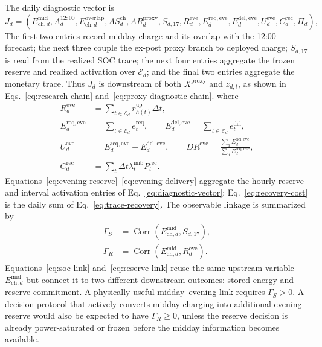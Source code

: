 \documentclass[11pt,a4paper]{article}
\begin{document}
The daily diagnostic vector is
\begin{equation}
  J_d=\left(
  E^{\mathrm{mid}}_{\mathrm{ch},d},
  A^{12{:}00}_d,
  E^{\mathrm{overlap}}_{\mathrm{ch},d},
  AS^{\mathrm{ch}}_d,AR^{\mathrm{proxy}}_d,
  S_{d,17},R^{\mathrm{eve}}_d,
  E^{\mathrm{req,eve}}_d,E^{\mathrm{del,eve}}_d,
  U^{\mathrm{eve}}_d,C^{\mathrm{rec}}_d,\Pi_d
  \right),
  \label{eq:diagnostic-vector}
\end{equation}
The first two entries record midday charge and its overlap with the 12:00
forecast; the next three couple the ex-post proxy branch to deployed charge;
$S_{d,17}$ is read from the realized SOC trace; the next four entries aggregate
the frozen reserve and realized activation over $\mathcal E_d$; and the final
two entries aggregate the monetary trace.  Thus $J_d$ is downstream of both
$X^{\mathrm{proxy}}$ and $z_{d,t}$, as shown in
Eqs.~\eqref{eq:research-chain} and~\eqref{eq:proxy-diagnostic-chain}.
where
\begin{align}
  R^{\mathrm{eve}}_d
  &=\sum_{t\in\mathcal{E}_d}r^{\mathrm{up}}_{h(t)}\Delta t,
  \label{eq:evening-reserve}\\
  E^{\mathrm{req,eve}}_d
  &=\sum_{t\in\mathcal{E}_d}e^{\mathrm{req}}_t,
  \qquad
  E^{\mathrm{del,eve}}_d
  =\sum_{t\in\mathcal{E}_d}e^{\mathrm{del}}_t,
  \label{eq:evening-activation}\\
  U^{\mathrm{eve}}_d
  &=E^{\mathrm{req,eve}}_d-E^{\mathrm{del,eve}}_d,
  \qquad
  DR^{\mathrm{eve}}
  =\frac{\sum_dE^{\mathrm{del,eve}}_d}
  {\sum_dE^{\mathrm{req,eve}}_d},
  \label{eq:evening-delivery}\\
  C^{\mathrm{rec}}_d
  &=\sum_t\Delta t\lambda^{\mathrm{imb}}_tP^{\mathrm{rec}}_t.
  \label{eq:recovery-cost}
\end{align}
Equations~\eqref{eq:evening-reserve}--\eqref{eq:evening-delivery} aggregate
the hourly reserve and interval activation entries of
Eq.~\eqref{eq:diagnostic-vector}; Eq.~\eqref{eq:recovery-cost} is the daily
sum of Eq.~\eqref{eq:trace-recovery}.
The observable linkage is summarized by
\begin{align}
  \Gamma_{S}
  &=\operatorname{Corr}\!\left(E^{\mathrm{mid}}_{\mathrm{ch},d},S_{d,17}\right),
  \label{eq:soc-link}\\
  \Gamma_{R}
  &=\operatorname{Corr}\!\left(E^{\mathrm{mid}}_{\mathrm{ch},d},R^{\mathrm{eve}}_d\right).
  \label{eq:reserve-link}
\end{align}
Equations~\eqref{eq:soc-link} and~\eqref{eq:reserve-link} reuse the same
upstream variable $E^{\mathrm{mid}}_{\mathrm{ch},d}$ but connect it to two
different downstream outcomes: stored energy and reserve commitment.
A physically useful midday--evening link requires $\Gamma_S>0$.  A decision
protocol that actively converts midday charging into additional evening reserve
would also be expected to have $\Gamma_R\geq0$, unless the reserve decision is
already power-saturated or frozen before the midday information becomes
available.
\end{document}
